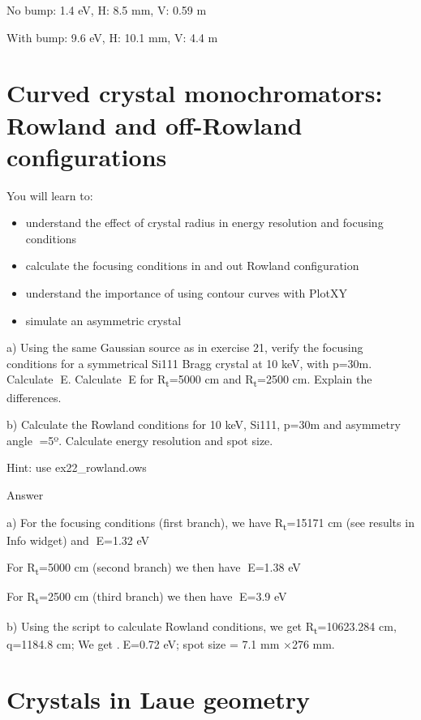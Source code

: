 \documentclass[]{article}
\providecommand{\tightlist}{%
  \setlength{\itemsep}{0pt}\setlength{\parskip}{0pt}}
\begin{document}
No bump: 1.4 eV, H: 8.5 mm, V: 0.59 m

With bump: 9.6 eV, H: 10.1 mm, V: 4.4 m

\section{Curved crystal monochromators: Rowland and off-Rowland
configurations}\label{curved-crystal-monochromators-rowland-and-off-rowland-configurations}

You will learn to:

\begin{itemize}
\tightlist
\item
  understand the effect of crystal radius in energy resolution and
  focusing conditions
\item
  calculate the focusing conditions in and out Rowland configuration 
\item
  understand the importance of using contour curves with PlotXY
\item
  simulate an asymmetric crystal
\end{itemize}

a) Using the same Gaussian source as in exercise 21, verify the focusing
conditions for a symmetrical Si111 Bragg crystal at 10 keV, with p=30m.
Calculate E. Calculate E for R\textsubscript{t}=5000 cm and
R\textsubscript{t}=2500 cm. Explain the differences.

b) Calculate the Rowland conditions for 10 keV, Si111, p=30m and
asymmetry angle =5º. Calculate energy resolution and spot size.

Hint: use ex22\_rowland.ows

Answer

a) For the focusing conditions (first branch), we have
R\textsubscript{t}=15171 cm (see results in Info widget) and E=1.32 eV

For R\textsubscript{t}=5000 cm (second branch) we then have E=1.38 eV

For R\textsubscript{t}=2500 cm (third branch) we then have E=3.9 eV

b) Using the script to calculate Rowland conditions, we get
R\textsubscript{t}=10623.284 cm, q=1184.8 cm; We get .E=0.72 eV; spot
size = 7.1 mm ×276 mm.

\section{Crystals in Laue geometry}\label{crystals-in-laue-geometry}
\end{document}
